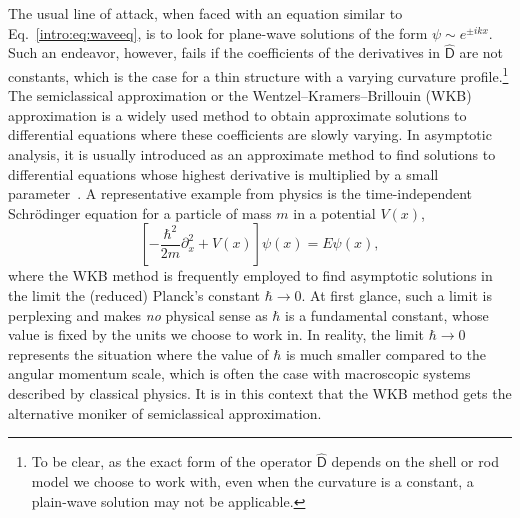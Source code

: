 The usual line of attack, when faced with an equation similar to Eq.~\eqref{intro:eq:waveeq}, is to look for plane-wave solutions of the form $\psi \sim e^{\pm i kx}$.
Such an endeavor, however, fails if the coefficients of the derivatives in $\widehat{\mathsf{D}}$ are not constants, which is the case for a thin structure with a varying curvature profile.\footnote{To be clear, as the exact form of the operator $\widehat{\mathsf{D}}$ depends on the shell or rod model we choose to work with, even when the curvature is a constant, a plain-wave solution may not be applicable.}
The semiclassical approximation or the Wentzel--Kramers--Brillouin (WKB) approximation is a widely used method to obtain approximate solutions to differential equations where these coefficients are slowly varying.
In asymptotic analysis, it is usually introduced as an approximate method to find solutions to differential equations whose highest derivative is multiplied by a small parameter~\cite{bender1978}.
A representative example from physics is the time-independent Schr\"{o}dinger equation for a particle of mass $m$ in a potential $V(x)$,
%
\begin{equation}
  \left[-\frac{\hbar^{2}}{2m}\partial_{x}^{2} + V(x)\right]\psi(x) = E\psi(x),
\end{equation}
%
where the WKB method is frequently employed to find asymptotic solutions in the limit the (reduced) Planck's constant $\hbar \to 0$.
At first glance, such a limit is perplexing and makes \emph{no} physical sense as $\hbar$ is a fundamental constant, whose value is fixed by the units we choose to work in.
In reality, the limit $\hbar \to 0$ represents the situation where the value of $\hbar$ is much smaller compared to the angular momentum scale, which is often the case with macroscopic systems described by classical physics.
It is in this context that the WKB method gets the alternative moniker of semiclassical approximation.%

